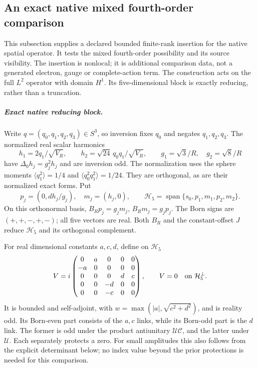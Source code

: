 \documentclass[11pt,a4paper]{article}
\begin{document}
\subsection{An exact native mixed fourth-order comparison}
\label{p3f:app:native-mixed-quartic-comparison}

This subsection supplies a declared bounded finite-rank insertion for the
native spatial operator. It tests the mixed fourth-order possibility and
its source visibility. The insertion is nonlocal; it is additional
comparison data, not a generated electron, gauge or complete-action term.
The construction acts on the full \(L^2\) operator with domain \(H^1\).
Its five-dimensional block is exactly reducing, rather than a truncation.

\subparagraph{Exact native reducing block.}
Write \(q=(q_0,q_1,q_2,q_3)\in S^3\), so inversion fixes \(q_0\)
and negates \(q_1,q_2,q_3\). The normalized real scalar harmonics
\[
 h_1=2q_1/\sqrt{V_R},\qquad h_2=\sqrt{24}\,q_0q_1/\sqrt{V_R},
 \qquad g_1=\sqrt3/R,\quad g_2=\sqrt8/R
\]
have \(\Delta_0h_j=g_j^2h_j\) and are inversion odd. The normalization
uses the sphere moments \(\langle q_1^2\rangle=1/4\) and
\(\langle q_0^2q_1^2\rangle=1/24\). They are orthogonal, as are their
normalized exact forms. Put
\[
 p_j=(0,dh_j/g_j),\quad m_j=(h_j,0),\qquad
 \mathcal H_5=\operatorname{span}\{s_0,p_1,m_1,p_2,m_2\}.
\]
On this orthonormal basis, \(B_Rp_j=g_jm_j\), \(B_Rm_j=g_jp_j\).
The Born signs are \((+,+,-,+,-)\); all five vectors are real.
Both \(B_R\) and the constant-offset \(J\) reduce \(\mathcal H_5\)
and its orthogonal complement.

For real dimensional constants \(a,c,d\), define on \(\mathcal H_5\)
\[
 V=i\begin{pmatrix}
 0&a&0&0&0\\-a&0&0&0&0\\0&0&0&d&c\\
 0&0&-d&0&0\\0&0&-c&0&0
 \end{pmatrix},\qquad V=0\quad\hbox{on }\mathcal H_5^\perp.
\]
It is bounded and self-adjoint, with
\(w=\max(|a|,\sqrt{c^2+d^2})\), and is reality odd. Its Born-even
part consists of the \(a,c\) links, while its Born-odd part is the
\(d\) link. The former is odd under the product antiunitary
\(\mathcal U\mathcal C\), and the latter under \(\mathcal U\).
Each separately protects a zero. For small amplitudes this also follows
from the explicit determinant below; no index value beyond the prior
protections is needed for this comparison.
\end{document}
